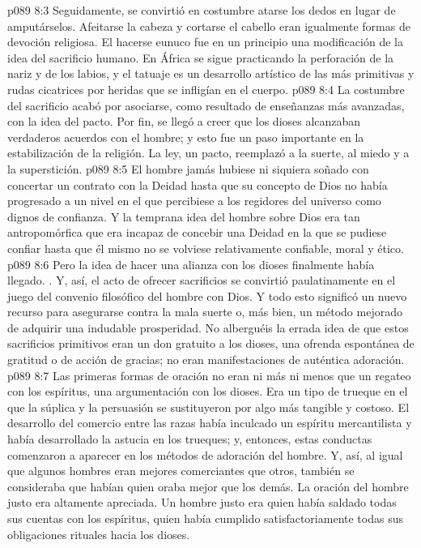 \vs p089 8:3 Seguidamente, se convirtió en costumbre atarse los dedos en lugar de amputárselos. Afeitarse la cabeza y cortarse el cabello eran igualmente formas de devoción religiosa. El hacerse eunuco fue en un principio una modificación de la idea del sacrificio humano. En África se sigue practicando la perforación de la nariz y de los labios, y el tatuaje es un desarrollo artístico de las más primitivas y rudas cicatrices por heridas que se infligían en el cuerpo.
\vs p089 8:4 \pc La costumbre del sacrificio acabó por asociarse, como resultado de enseñanzas más avanzadas, con la idea del pacto. Por fin, se llegó a creer que los dioses alcanzaban verdaderos acuerdos con el hombre; y esto fue un paso importante en la estabilización de la religión. La ley, un pacto, reemplazó a la suerte, al miedo y a la superstición.
\vs p089 8:5 El hombre jamás hubiese ni siquiera soñado con concertar un contrato con la Deidad hasta que su concepto de Dios no había progresado a un nivel en el que percibiese a los regidores del universo como dignos de confianza. Y la temprana idea del hombre sobre Dios era tan antropomórfica que era incapaz de concebir una Deidad en la que se pudiese confiar hasta que él mismo no se volviese relativamente confiable, moral y ético.
\vs p089 8:6 Pero la idea de hacer una alianza con los dioses finalmente había llegado. . Y, así, el acto de ofrecer sacrificios se convirtió paulatinamente en el juego del convenio filosófico del hombre con Dios. Y todo esto significó un nuevo recurso para asegurarse contra la mala suerte o, más bien, un método mejorado de adquirir una indudable prosperidad. No alberguéis la errada idea de que estos sacrificios primitivos eran un don gratuito a los dioses, una ofrenda espontánea de gratitud o de acción de gracias; no eran manifestaciones de auténtica adoración.
\vs p089 8:7 \pc Las primeras formas de oración no eran ni más ni menos que un regateo con los espíritus, una argumentación con los dioses. Era un tipo de trueque en el que la súplica y la persuasión se sustituyeron por algo más tangible y costoso. El desarrollo del comercio entre las razas había inculcado un espíritu mercantilista y había desarrollado la astucia en los trueques; y, entonces, estas conductas comenzaron a aparecer en los métodos de adoración del hombre. Y, así, al igual que algunos hombres eran mejores comerciantes que otros, también se consideraba que habían quien oraba mejor que los demás. La oración del hombre justo era altamente apreciada. Un hombre justo era quien había saldado todas sus cuentas con los espíritus, quien había cumplido satisfactoriamente todas sus obligaciones rituales hacia los dioses.

